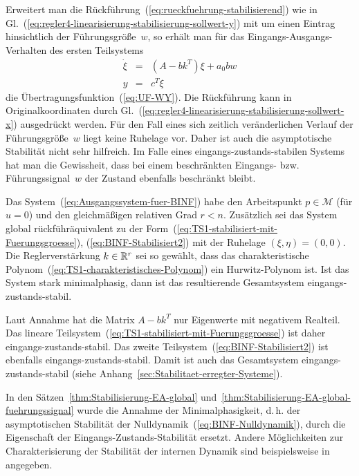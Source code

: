 Erweitert man die Rückführung~(\ref{eq:rueckfuehrung-stabilisierend})
wie in Gl.~(\ref{eq:regler4-linearisierung-stabilisierung-sollwert-y})
mit um einen Eintrag hinsichtlich der Führungsgröße~$w$, so erhält
man für das Eingangs-Ausgangs-Verhalten des ersten Teilsystems
\begin{equation}
\begin{array}{lcl}
\dot{\xi} & = & \left(A-bk^{T}\right)\xi+a_{0}bw\\
y & = & c^{T}\xi
\end{array}\label{eq:TS1-stabilisiert-mit-Fuerungsgroesse}
\end{equation}
die Übertragungsfunktion~(\ref{eq:UF-WY}). Die Rückführung kann
in Originalkoordinaten durch Gl.~(\ref{eq:regler4-linearisierung-stabilisierung-sollwert-x})
ausgedrückt werden. Für den Fall eines sich zeitlich veränderlichen
Verlauf der Führungsgröße~$w$ liegt keine Ruhelage vor. Daher ist
auch die asymptotische Stabilität nicht sehr hilfreich. Im Falle eines
eingangs-zustands-stabilen Systems hat man die Gewissheit, dass bei
einem beschränkten Eingangs- bzw. Führungssignal~$w$ der Zustand
ebenfalls beschränkt bleibt.
\begin{theorem}
\label{thm:Stabilisierung-EA-global-fuehrungssignal}Das System~(\ref{eq:Ausgangssystem-fuer-BINF})
habe den Arbeitspunkt $p\in\mathcal{M}$ (für $u=0$) und den gleichmäßigen
relativen Grad $r<n$. Zusätzlich sei das System global rück\-führ\-äquivalent
zu der Form~(\ref{eq:TS1-stabilisiert-mit-Fuerungsgroesse}), (\ref{eq:BINF-Stabilisiert2})
mit der Ruhelage $(\xi,\eta)=(0,0)$. Die Reglerverstärkung $k\in{\mathbb{R}}^{r}$
sei so gewählt, dass das charakteristische Polynom~(\ref{eq:TS1-charakteristisches-Polynom})
ein Hurwitz-Polynom ist. Ist das System stark minimalphasig, dann
ist das resultierende Gesamtsystem eingangs-zustands-stabil.
\end{theorem}
\begin{svmultproof2}
Laut Annahme hat die Matrix $A-bk^{T}$ nur Eigenwerte mit negativem
Realteil. Das lineare Teilsystem~(\ref{eq:TS1-stabilisiert-mit-Fuerungsgroesse})
ist daher eingangs-zustands-stabil. Das zweite Teilsystem~(\ref{eq:BINF-Stabilisiert2})
ist ebenfalls eingangs-zustands-stabil. Damit ist auch das Gesamtsystem
eingangs-zustands-stabil (siehe Anhang~\ref{sec:Stabilitaet-erregter-Systeme}).
\end{svmultproof2}

In den Sätzen~\ref{thm:Stabilisierung-EA-global} und~\ref{thm:Stabilisierung-EA-global-fuehrungssignal}
wurde die Annahme der Minimalphasigkeit, d.\,h. der asymptotischen
Stabilität der Nulldynamik~(\ref{eq:BINF-Nulldynamik}), durch die
Eigenschaft der Eingangs-Zustands-Stabilität ersetzt. Andere Möglichkeiten
zur Charakterisierung der Stabilität der internen Dynamik sind beispielsweise
in~\cite{krichman1999,liberzon2000} angegeben.


